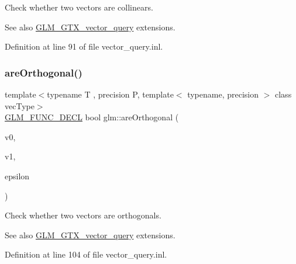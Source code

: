 Check whether two vectors are collinears. \begin{DoxySeeAlso}{See also}
\hyperlink{group__gtx__vector__query}{G\+L\+M\+\_\+\+G\+T\+X\+\_\+vector\+\_\+query} extensions. 
\end{DoxySeeAlso}


Definition at line 91 of file vector\+\_\+query.\+inl.

\mbox{\label{group__gtx__vector__query_gaee10acefed397c11e01f2862e837754c}} 
\subsubsection{\texorpdfstring{are\+Orthogonal()}{areOrthogonal()}}
{\footnotesize\ttfamily template$<$typename T , precision P, template$<$ typename, precision $>$ class vec\+Type$>$ \\
\hyperlink{setup_8hpp_ab2d052de21a70539923e9bcbf6e83a51}{G\+L\+M\+\_\+\+F\+U\+N\+C\+\_\+\+D\+E\+CL} bool glm\+::are\+Orthogonal (\begin{DoxyParamCaption}\item[{vec\+Type$<$ T, P $>$ const \&}]{v0,  }\item[{vec\+Type$<$ T, P $>$ const \&}]{v1,  }\item[{T const \&}]{epsilon }\end{DoxyParamCaption})}

Check whether two vectors are orthogonals. \begin{DoxySeeAlso}{See also}
\hyperlink{group__gtx__vector__query}{G\+L\+M\+\_\+\+G\+T\+X\+\_\+vector\+\_\+query} extensions. 
\end{DoxySeeAlso}


Definition at line 104 of file vector\+\_\+query.\+inl.

\mbox{\label{group__gtx__vector__query_ga89c82bc60e5b84e4489b74c15a134caf}} 
